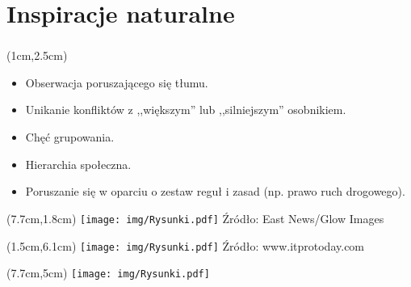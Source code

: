 \documentclass{beamer}
\begin{document}
\section{Inspiracje naturalne}
\begin{frame}
\frametitle{\secname}


\begin{textblock*}{6.5cm}(1cm,2.5cm) %
\footnotesize
\begin{itemize}
	\item Obserwacja poruszającego się tłumu.
	\item Unikanie konfliktów z ,,większym'' lub ,,silniejszym'' osobnikiem.
	\item Chęć grupowania.
	\item Hierarchia społeczna.	
	\item Poruszanie się w oparciu o zestaw reguł i zasad (np. prawo ruch drogowego).
\end{itemize}
\end{textblock*}

\begin{textblock*}{5cm}(7.7cm,1.8cm) %
	\texttt{[image: img/Rysunki.pdf]}
	\tiny{Źródło: East News/Glow Images}
\end{textblock*}

\begin{textblock*}{6cm}(1.5cm,6.1cm) %
	\texttt{[image: img/Rysunki.pdf]}
	\tiny{Źródło: www.itprotoday.com}
\end{textblock*}

\begin{textblock*}{5cm}(7.7cm,5cm) %
	\texttt{[image: img/Rysunki.pdf]}
\end{textblock*}

\end{frame}
\end{document}

